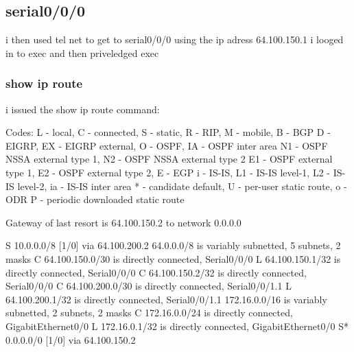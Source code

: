 \subsection{serial0/0/0}
i then used tel net to get to serial0/0/0 using the ip adress  64.100.150.1
i looged in to exec and then priveledged exec

\subsubsection{show ip route}
i issued the show ip route command:

Codes: L - local, C - connected, S - static, R - RIP, M - mobile, B - BGP
       D - EIGRP, EX - EIGRP external, O - OSPF, IA - OSPF inter area
       N1 - OSPF NSSA external type 1, N2 - OSPF NSSA external type 2
       E1 - OSPF external type 1, E2 - OSPF external type 2, E - EGP
       i - IS-IS, L1 - IS-IS level-1, L2 - IS-IS level-2, ia - IS-IS inter area
       * - candidate default, U - per-user static route, o - ODR
       P - periodic downloaded static route

Gateway of last resort is 64.100.150.2 to network 0.0.0.0

S    10.0.0.0/8 [1/0] via 64.100.200.2
     64.0.0.0/8 is variably subnetted, 5 subnets, 2 masks
C       64.100.150.0/30 is directly connected, Serial0/0/0
L       64.100.150.1/32 is directly connected, Serial0/0/0
C       64.100.150.2/32 is directly connected, Serial0/0/0
C       64.100.200.0/30 is directly connected, Serial0/0/1.1
L       64.100.200.1/32 is directly connected, Serial0/0/1.1
     172.16.0.0/16 is variably subnetted, 2 subnets, 2 masks
C       172.16.0.0/24 is directly connected, GigabitEthernet0/0
L       172.16.0.1/32 is directly connected, GigabitEthernet0/0
S*   0.0.0.0/0 [1/0] via 64.100.150.2




